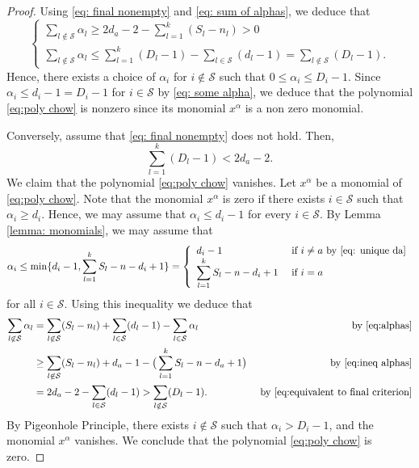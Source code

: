 \documentclass[11pt]{amsart}
\numberwithin{equation}{section}
\theoremstyle{plain}
\numberwithin{theorem}{section}
\theoremstyle{definition}
\begin{document}
\begin{proof}
\noindent Using \eqref{eq: final nonempty} and \eqref{eq: sum of alphas}, we deduce that
    \begin{equation*}
    \left\{\begin{array}{ll}
    \displaystyle\sum_{l\notin\mathcal S}\alpha_l\ge2d_a-2-\sum_{l=1}^k(S_l-n_l)>0\\
        \displaystyle\sum_{l\not\in\mathcal S}\alpha_l\le\sum_{l=1}^k(D_l-1)-\sum_{l\in\mathcal S}(d_l-1)=\sum_{l\notin\mathcal S}(D_l-1).
    \end{array}\right.
    \end{equation*}
    Hence, there exists a choice of $\alpha_i$ for $i\not\in\mathcal S$ such that $0\leq\alpha_i\leq D_i-1$. Since $\alpha_i\leq d_i-1=D_i-1$ for $i\in\mathcal S$ by \eqref{eq: some alpha}, we deduce that the polynomial \eqref{eq:poly chow} is nonzero since its monomial $x^\alpha$ is a non zero monomial.

Conversely, assume that \eqref{eq: final nonempty} does not hold. Then, \begin{equation}\label{eq:equivalent to final criterion}
        \displaystyle\sum_{l=1}^k(D_l-1)<2d_a-2.
    \end{equation}
    We claim that the polynomial \eqref{eq:poly chow} vanishes. Let $x^\alpha$ be a monomial of \eqref{eq:poly chow}.
    Note that the monomial $x^\alpha$ is zero if there exists $i\in\mathcal S$ such that $\alpha_i\ge d_i$. Hence, we may assume that $\alpha_i\leq d_i-1$ for every $i\in\mathcal S$. By Lemma \ref{lemma: monomials}, we may assume that 
    \begin{equation}\label{eq:ineq alphas}
    \alpha_i\leq \min\{d_i-1,\sum_{l=1}^k S_l-n-d_i+1\}=\left\{\begin{array}{ll}
             d_i-1&\text{ if }i\ne a\text{ by \eqref{eq: unique da}}\\
             \displaystyle\sum_{l=1}^k S_l-n-d_i+1&\text{ if }i=a
        \end{array}\right.
    \end{equation}
    for all $i\in\mathcal S$. Using this inequality we deduce that 
    \begin{align*}
        \sum_{l\not\in\mathcal S}\alpha_l&=\sum_{l\not\in\mathcal S} (S_l-n_l)+\sum_{l\in\mathcal S}(d_l-1)-\sum_{l\in\mathcal S}\alpha_l&\text{ by \eqref{eq:alphas}}\\
        &\geq \sum_{l\not\in\mathcal S} (S_l-n_l)+d_a-1-\big(\sum_{l=1}^kS_l-n-d_a+1\big)&\text{ by \eqref{eq:ineq alphas}}\\
        &=2d_a-2-\sum_{l\in\mathcal S}(d_l-1)>\sum_{l\notin\mathcal S}(D_l-1).&\text{ by \eqref{eq:equivalent to final criterion}}
    \end{align*}
    By Pigeonhole Principle, there exists $i\not\in\mathcal S$ such that $\alpha_i>D_i-1$, and the monomial $x^\alpha$ vanishes. We conclude that the polynomial \eqref{eq:poly chow} is zero.
\end{proof}
\end{document}
